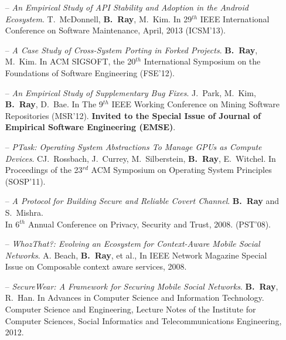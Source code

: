 \documentclass[overlapped,line,letterpaper, 12pt]{res}
\begin{document}
\begin{resume}
\begin{itemize}
\item[--]
{\em An Empirical Study of API Stability and Adoption in the Android Ecosystem}. 
T.~McDonnell, {\bf B.~Ray},  M.~Kim. 
{\small In 29$^{th}$ IEEE International Conference on Software Maintenance, April, 2013 (ICSM'13).}

\item[--]
{\em A Case Study of Cross-System Porting in Forked Projects}. 
{\bf B.~Ray}, M.~Kim.
{\small In ACM SIGSOFT, the 20$^{th}$ International Symposium on the Foundations of Software Engineering
(FSE'12).}

\item[--]
{\em An Empirical Study of Supplementary Bug Fixes}. 
J.~Park, M.~Kim, {\bf B.~Ray}, D.~Bae. 
{\small In The 9$^{th}$ IEEE Working Conference on Mining Software Repositories (MSR'12).}
\textbf{\small{Invited to the Special Issue of Journal of Empirical Software Engineering (EMSE)}}.

\item[--]
{\em PTask: Operating System Abstractions To Manage GPUs as Compute Devices}.
CJ.~Rossbach, J.~Currey, M.~Silberstein, {\bf B.~Ray}, E.~Witchel. 
{\small In Proceedings of the 23$^{rd}$ ACM Symposium on Operating System Principles (SOSP'11)}. 


\item[--]
{\em A Protocol for Building Secure and Reliable Covert Channel}. 
{\bf B.~Ray} and S.~Mishra. \\
{\small In 6$^{th}$ Annual Conference on Privacy, Security and Trust, 2008. (PST'08).}

\item[--]
{\em WhozThat?: Evolving an Ecosystem for Context-Aware Mobile Social Networks}.
A. Beach, {\bf B.~Ray}, et al., {\small In IEEE Network Magazine Special Issue on Composable context aware services, 
2008.}

\item[--]
{\em SecureWear: A Framework for Securing Mobile Social Networks}.
{\bf B.~Ray},  R.~Han. 
{\small In Advances in Computer Science and Information Technology. Computer Science and Engineering, Lecture Notes of the Institute for Computer Sciences, Social Informatics and Telecommunications Engineering, 2012.}
\end{itemize}


\end{resume}
\end{document}
